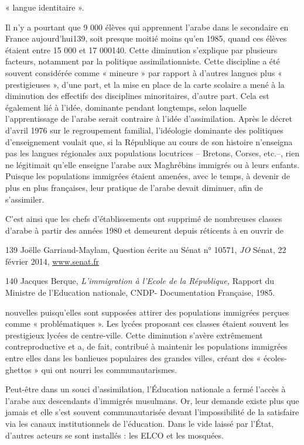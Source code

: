 « langue identitaire ».

Il n'y a pourtant que 9 000 élèves qui apprennent l'arabe dans le
secondaire en France aujourd'hui139, soit presque moitié moins qu'en
1985, quand ces élèves étaient entre 15 000 et 17 000140. Cette
diminution s'explique par plusieurs facteurs, notamment par la politique
assimilationniste. Cette discipline a été souvent considérée comme «
mineure » par rapport à d'autres langues plus « prestigieuses », d'une
part, et la mise en place de la carte scolaire a mené à la diminution
des effectifs des disciplines minoritaires, d'autre part. Cela est
également lié à l'idée, dominante pendant longtemps, selon laquelle
l'apprentissage de l'arabe serait contraire à l'idée d'assimilation.
Après le décret d'avril 1976 sur le regroupement familial, l'idéologie
dominante des politiques d'enseignement voulait que, si la République au
cours de son histoire n'enseigna pas les langues régionales aux
populations locutrices -- Bretons, Corses, etc.--, rien ne légitimait
qu'elle enseigne l'arabe aux Maghrébins immigrés ou à leurs enfants.
Puisque les populations immigrées étaient amenées, avec le temps, à
devenir de plus en plus françaises, leur pratique de l'arabe devait
diminuer, afin de s'assimiler.

C'est ainsi que les chefs d'établissements ont supprimé de nombreuses
classes d'arabe à partir des années 1980 et demeurent depuis réticents à
en ouvrir de

139 Joëlle Garriaud-Maylam, Question écrite au Sénat n° 10571, \emph{JO}
Sénat, 22 février 2014, \href{http://www.senat.fr/}{www.senat.fr}

140 Jacques Berque, \emph{L'immigration à l'Ecole de la République,}
Rapport du Ministre de l'Education nationale, CNDP- Documentation
Française, 1985.



nouvelles puisqu'elles sont supposées attirer des populations immigrées
perçues comme « problématiques ». Les lycées proposant ces classes
étaient souvent les prestigieux lycées de centre-ville. Cette diminution
s'avère extrêmement contreproductive et a, de fait, contribué à
maintenir les populations immigrées entre elles dans les banlieues
populaires des grandes villes, créant des « écoles-ghettos » qui ont
nourri les communautarismes.

Peut-être dans un souci d'assimilation, l'Éducation nationale a fermé
l'accès à l'arabe aux descendants d'immigrés musulmans. Or, leur demande
existe plus que jamais et elle s'est souvent communautarisée devant
l'impossibilité de la satisfaire via les canaux institutionnels de
l'éducation. Dans le vide laissé par l'État, d'autres acteurs se sont
installés : les ELCO et les mosquées.


